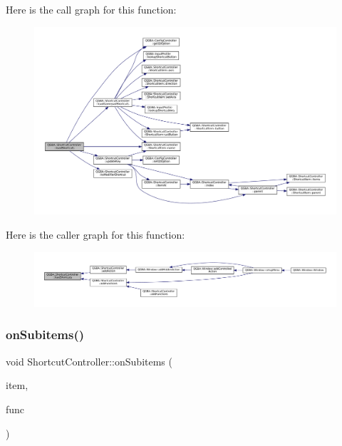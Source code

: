 Here is the call graph for this function\+:
\nopagebreak
\begin{figure}[H]
\begin{center}
\leavevmode
\includegraphics[width=350pt]{class_q_g_b_a_1_1_shortcut_controller_a91bd0c455902e715c0133b21a819dd12_cgraph}
\end{center}
\end{figure}
Here is the caller graph for this function\+:
\nopagebreak
\begin{figure}[H]
\begin{center}
\leavevmode
\includegraphics[width=350pt]{class_q_g_b_a_1_1_shortcut_controller_a91bd0c455902e715c0133b21a819dd12_icgraph}
\end{center}
\end{figure}
\mbox{\label{class_q_g_b_a_1_1_shortcut_controller_a25d9133d4546e69a56135f162badb4c0}} 
\subsubsection{\texorpdfstring{on\+Subitems()}{onSubitems()}}
{\footnotesize\ttfamily void Shortcut\+Controller\+::on\+Subitems (\begin{DoxyParamCaption}\item[{\mbox{\hyperlink{class_q_g_b_a_1_1_shortcut_controller_1_1_shortcut_item}{Shortcut\+Item}} $\ast$}]{item,  }\item[{std\+::function$<$ void(\mbox{\hyperlink{class_q_g_b_a_1_1_shortcut_controller_1_1_shortcut_item}{Shortcut\+Item}} $\ast$)$>$}]{func }\end{DoxyParamCaption})\hspace{0.3cm}{\ttfamily [private]}}

